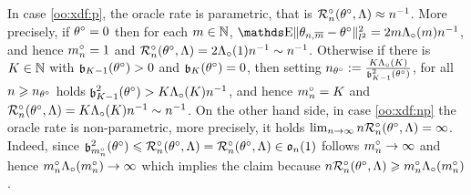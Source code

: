 \begin{rmk}
In case \ref{oo:xdf:p}, the oracle rate is parametric, that is
$\oRa{\xdf, \Lambda} \approx \ssY^{-1}$. More precisely, if $\xdf=0$ then
for each  $\Di\in\Nz$,
$\E\Vnormlp{\txdfPr-\xdf}^2=2\Di\oiSv[\Di]\ssY^{-1}$,
and hence $\oDi{\ssY}=1$ and $\oRa{\xdf, \Lambda}=2\oiSv[1]\ssY^{-1}\sim\ssY^{-1}$. Otherwise
if there is $K\in\Nz$  with $\bias[K-1](\xdf)>0$ and
$\bias[K](\xdf)=0$, then setting
$\ssY_{\xdf}:=\tfrac{K\oiSv[K]}{\bias[K-1]^2(\xdf)}$, for all
$\ssY\geq \ssY_{\xdf}$ holds
$\bias[K-1]^2(\xdf)>K\oiSv[K]\ssY^{-1}$, and hence  $\oDi{\ssY}=K$ and
$\oRa{\xdf,\Lambda}= K\oiSv[K]\ssY^{-1}\sim \ssY^{-1}$.
On the other hand side, in case \ref{oo:xdf:np} the oracle rate is
non-parametric, more precisely, it holds
$\lim_{\ssY\to\infty}\ssY\oRa{\xdf,\Lambda}=\infty$. Indeed, since
$\bias[\oDi{\ssY}]^2(\xdf)\leq\oRa{\xdf,\Lambda}=\oRa{\xdf,\Lambda}\in\mathfrak{o}_{n}(1)$ follows $\oDi{\ssY}\to\infty$ and hence
$\oDi{\ssY}\oiSv[\oDi{\ssY}]\to\infty$ which implies the claim because
$\ssY\oRa{\xdf,\Lambda}\geq\oDi{\ssY}\oiSv[\oDi{\ssY}]$.
\end{rmk}

